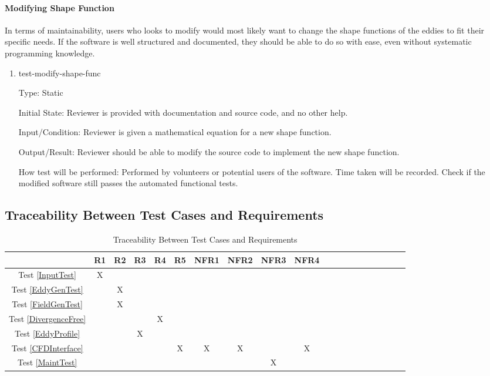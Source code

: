 \documentclass[12pt, titlepage]{article}
\begin{document}
\paragraph{Modifying Shape Function\\}
In terms of maintainability, users who looks to modify \progname{} would most likely want to change the shape functions of the eddies to fit their specific needs. If the software is well structured and documented, they should be able to do so with ease, even without systematic programming knowledge.

\begin{enumerate}

\item{test-modify-shape-func\\}

Type: Static
					
Initial State: Reviewer is provided with documentation and source code, and no other help.
					
Input/Condition: Reviewer is given a mathematical equation for a new shape function.
					
Output/Result: Reviewer should be able to modify the source code to implement the new shape function.
					
How test will be performed: Performed by volunteers or potential users of the software. Time taken will be recorded. Check if the modified software still passes the automated functional tests.

\end{enumerate}

\newpage
\subsection{Traceability Between Test Cases and Requirements}
\begin{table}[h!]
  \centering
  \begin{tabular}{|c|c|c|c|c|c|c|c|c|c|c|c|c|c|c|c|c|c|c|c|}
  \hline
                            & R1 & R2 & R3 & R4 & R5 & NFR1 & NFR2 & NFR3 & NFR4 \\
  \hline
  Test \ref{InputTest}      & X  &    &    &    &    &      &      &      &      \\\hline
  Test \ref{EddyGenTest}    &    & X  &    &    &    &      &      &      &      \\\hline
  Test \ref{FieldGenTest}   &    & X  &    &    &    &      &      &      &      \\\hline
  Test \ref{DivergenceFree} &    &    &    & X  &    &      &      &      &      \\\hline
  Test \ref{EddyProfile}    &    &    & X  &    &    &      &      &      &      \\\hline
  Test \ref{CFDInterface}   &    &    &    &    & X  & X    & X    &      & X    \\\hline
  Test \ref{MaintTest}      &    &    &    &    &    &      &      & X    &      \\\hline
  \end{tabular}
  \caption{Traceability Between Test Cases and Requirements}
  \label{Table:A_trace}
\end{table}
\end{document}
